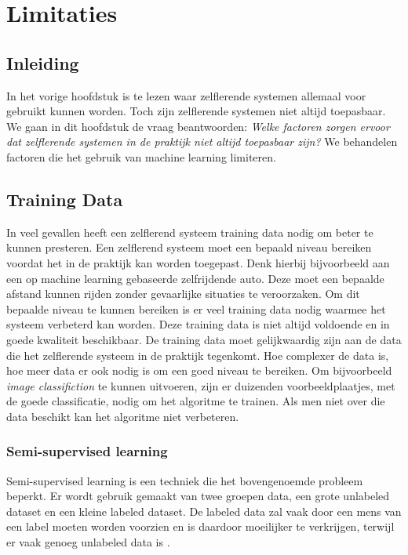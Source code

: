 \section{Limitaties}

\subsection{Inleiding}
In het vorige hoofdstuk is te lezen waar zelflerende systemen allemaal voor gebruikt kunnen worden. Toch zijn zelflerende systemen niet altijd toepasbaar. We gaan in dit hoofdstuk de vraag beantwoorden: \textit{Welke factoren zorgen ervoor dat zelflerende systemen in de praktijk niet altijd toepasbaar zijn?} We behandelen factoren die het gebruik van machine learning limiteren. 

\subsection{Training Data}
In  veel gevallen heeft een zelflerend systeem training data nodig om beter te kunnen presteren. Een zelflerend systeem moet een bepaald niveau bereiken voordat het in de praktijk kan worden toegepast. Denk hierbij bijvoorbeeld aan een op machine learning gebaseerde zelfrijdende auto. Deze moet een bepaalde afstand kunnen rijden zonder gevaarlijke situaties te veroorzaken. Om dit bepaalde niveau te kunnen bereiken is er veel training data nodig waarmee het systeem verbeterd kan worden. Deze training data is niet altijd voldoende en in goede kwaliteit beschikbaar. De training data moet gelijkwaardig zijn aan de data die het zelflerende systeem in de praktijk tegenkomt. Hoe complexer de data is, hoe meer data er ook nodig is om een goed niveau te bereiken. Om bijvoorbeeld \textit{image classifiction} te kunnen uitvoeren, zijn er duizenden voorbeeldplaatjes, met de goede classificatie, nodig om het algoritme te trainen. Als men niet over die data beschikt kan het algoritme niet verbeteren. 

\subsubsection{Semi-supervised learning}
Semi-supervised learning is een techniek die het bovengenoemde probleem beperkt. Er wordt gebruik gemaakt van twee groepen data, een grote unlabeled dataset en een kleine labeled dataset. De labeled data zal vaak door een mens van een label moeten worden voorzien en is daardoor moeilijker te verkrijgen, terwijl er vaak genoeg unlabeled data is \cite{SemiSupervisedLearning}.

